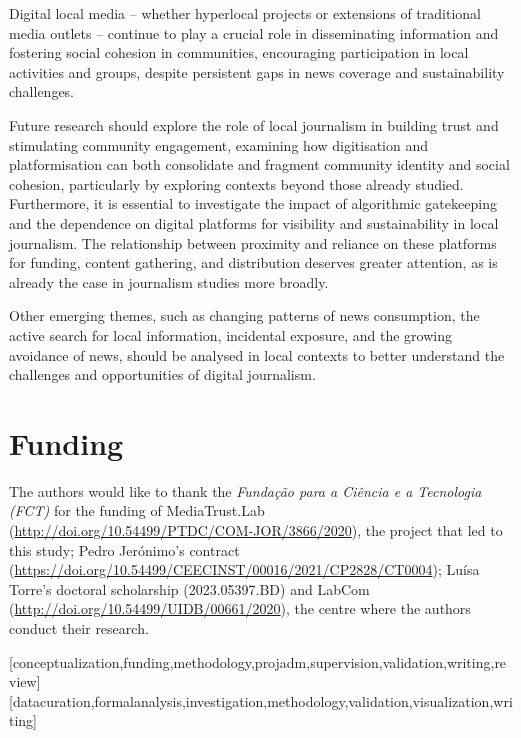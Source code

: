 \documentclass[english]{textolivre}
\begin{document}
Digital local media -- whether hyperlocal projects or extensions of traditional media outlets -- continue to play a crucial role in disseminating information and fostering social cohesion in communities, encouraging participation in local activities and groups, despite persistent gaps in news coverage and sustainability challenges.

Future research should explore the role of local journalism in building trust and stimulating community engagement, examining how digitisation and platformisation can both consolidate and fragment community identity and social cohesion, particularly by exploring contexts beyond those already studied. Furthermore, it is essential to investigate the impact of algorithmic gatekeeping and the dependence on digital platforms for visibility and sustainability in local journalism. The relationship between proximity and reliance on these platforms for funding, content gathering, and distribution deserves greater attention, as is already the case in journalism studies more broadly.

Other emerging themes, such as changing patterns of news consumption, the active search for local information, incidental exposure, and the growing avoidance of news, should be analysed in local contexts to better understand the challenges and opportunities of digital journalism.


\section{Funding}
The authors would like to thank the \emph{Fundação para a Ciência e a Tecnologia (FCT)} for the fun\-ding of MediaTrust.Lab (\url{http://doi.org/10.54499/PTDC/COM-JOR/3866/2020}), the project that led to this study; Pedro Jerónimo’s  contract  (\url{https://doi.org/10.54499/CEECINST/00016/2021/CP2828/CT0004}); Luísa Torre’s doctoral scholarship (2023.05397.BD) and LabCom  (\url{http://doi.org/10.54499/UIDB/00661/2020}), the centre where the authors conduct their research.


\printbibliography\label{sec-bib}

\begin{contributors}
[conceptualization,funding,methodology,projadm,supervision,validation,writing,review]
[datacuration,formalanalysis,investigation,methodology,validation,visualization,writing]
\end{contributors}

\begin{dataavailability}
\end{dataavailability}
\end{document}
